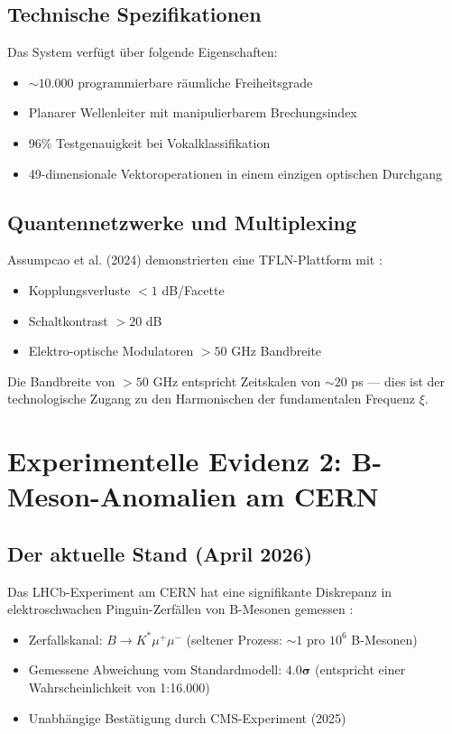 	\subsection{Technische Spezifikationen}
	
	Das System verfügt über folgende Eigenschaften:
	\begin{itemize}
		\item $\sim 10.000$ programmierbare räumliche Freiheitsgrade
		\item Planarer Wellenleiter mit manipulierbarem Brechungsindex
		\item 96\% Testgenauigkeit bei Vokalklassifikation
		\item 49-dimensionale Vektoroperationen in einem einzigen optischen Durchgang
	\end{itemize}
	
	\subsection{Quantennetzwerke und Multiplexing}
	
	Assumpcao et al. (2024) demonstrierten eine TFLN-Plattform mit \cite{Assumpcao2024}:
	\begin{itemize}
		\item Kopplungsverluste $< 1$ dB/Facette
		\item Schaltkontrast $> 20$ dB
		\item Elektro-optische Modulatoren $> 50$ GHz Bandbreite
	\end{itemize}
	
	Die Bandbreite von $>50$ GHz entspricht Zeitskalen von $\sim 20$ ps — dies ist der technologische Zugang zu den Harmonischen der fundamentalen Frequenz $\xi$.
	
	\section{Experimentelle Evidenz 2: B-Meson-Anomalien am CERN}
	
	\subsection{Der aktuelle Stand (April 2026)}
	
	Das LHCb-Experiment am CERN hat eine signifikante Diskrepanz in elektroschwachen Pinguin-Zerfällen von B-Mesonen gemessen \cite{CERN2026a, CERN2026b}:
	
	\begin{itemize}
		\item Zerfallskanal: $B \to K^* \mu^+\mu^-$ (seltener Prozess: $\sim 1$ pro $10^6$ B-Mesonen)
		\item Gemessene Abweichung vom Standardmodell: $\mathbf{4.0\sigma}$ (entspricht einer Wahrscheinlichkeit von 1:16.000)
		\item Unabhängige Bestätigung durch CMS-Experiment (2025)
	\end{itemize}
	
